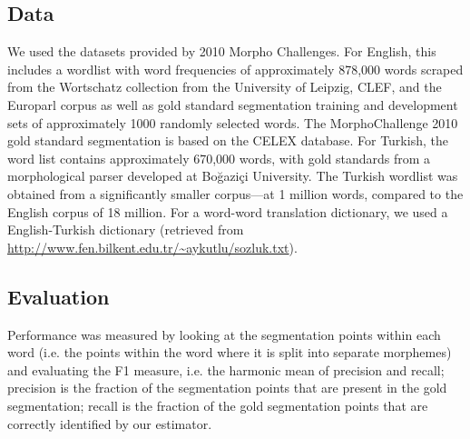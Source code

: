 \documentclass[11pt,twocolumn]{article}
\begin{document}
\subsection{Data}

We used the datasets provided by 2010 Morpho Challenges. For English, this includes
a wordlist with word frequencies of approximately 878,000 words scraped from the
Wortschatz collection from the University of Leipzig, CLEF, and the Europarl corpus
as well as gold standard segmentation training and development sets of approximately 
1000 randomly selected words. The MorphoChallenge 2010 gold standard segmentation is based on the CELEX database.
For Turkish, the word list contains approximately 670,000 words, with gold standards
from a morphological parser developed at Boğaziçi University. The Turkish wordlist
was obtained from a significantly smaller corpus---at 1 million words, compared
to the English corpus of 18 million. For a word-word translation dictionary,
we used a English-Turkish dictionary
(retrieved from \url{http://www.fen.bilkent.edu.tr/~aykutlu/sozluk.txt}).

\subsection{Evaluation}
Performance was measured by looking at the segmentation points within each word
(i.e. the points within the word where it is split into separate morphemes)
and evaluating the F1 measure, i.e. the harmonic mean of precision and recall;
precision is the fraction of the segmentation points that are present
in the gold segmentation; recall is the fraction of the gold segmentation points
that are correctly identified by our estimator.
\end{document}
